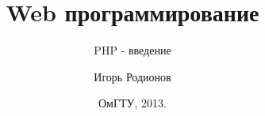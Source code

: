 \documentclass[10pt]{beamer}
\title[Web]{Web программирование}
\subtitle[PHP]{PHP - введение}
\author[Родионов И.Н.]{Игорь Родионов}
\institute[ОмГТУ ИВТ]{Омский Государственный Технический Университет\\
	{\tiny кафедра Информатики и вычислительной техники}\\
}
\date[2013]{ОмГТУ, 2013.}
\begin{document}
\begin{frame}[plain]
\maketitle
\end{frame}










\end{document}
